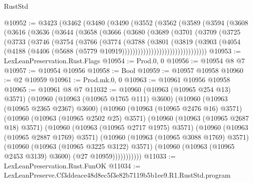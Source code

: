 \begin{lexlean}{RustStd}
\begin{coremodule}
@10952 := @3423
    (@3462
      (@3480
        (@3490
          (@3552
            (@3562
              (@3589
                (@3594
                  (@3608
                    (@3616
                      (@3636
                        (@3644
                          (@3658
                            (@3666
                              (@3680
                                (@3689
                                  (@3701
                                    (@3709
                                      (@3725
                                        (@3733
                                          (@3746
                                            (@3754
                                              (@3766
                                                (@3774
                                                  (@3788
                                                    (@3801
                                                      (@3819
                                                        (@3903
                                                          (@4054
                                                            (@4188
                                                              (@4406
                                                                (@5688
                                                                  (@5779
                                                                    @10919))))))))))))))))))))))))))))))))
@10953 := LexLeanPreservation.Rust.Flags
@10954 := Prod.{0, 0}
@10956 := @10954 @8 @7
@10957 := @10954 @10956
@10958 := Bool
@10959 := @10957 @10958
@10960 := @2 @10959
@10961 := Prod.mk.{0, 0}
@10963 := @10961 @10956 @10958
@10965 := @10961 @8 @7
@11032 := @10960
    (@10963 (@10965 @254 @13) @3571)
    (@10960
      (@10963 (@10965 @1765 @111) @3600)
      (@10960
        (@10963 (@10965 @2365 @2367) @3600)
        (@10960
          (@10963 (@10965 @2476 @16) @3571)
          (@10960
            (@10963 (@10965 @2502 @25) @3571)
            (@10960
              (@10963 (@10965 @2687 @18) @3571)
              (@10960
                (@10963 (@10965 @2717 @1975) @3571)
                (@10960
                  (@10963 (@10965 @2887 @1769) @3571)
                  (@10960
                    (@10963 (@10965 @3088 @1769) @3571)
                    (@10960
                      (@10963 (@10965 @3225 @3122) @3571)
                      (@10960 (@10963 (@10965 @2453 @3139) @3600) (@27 @10959)))))))))))
@11033 := LexLeanPreservation.Rust.FunOK
@11034 := LexLeanPreserve.Cf3ddeace48d8ec5f3e82b7119b5b1ee9.R1.RustStd.program

\end{coremodule}
\end{lexlean}
